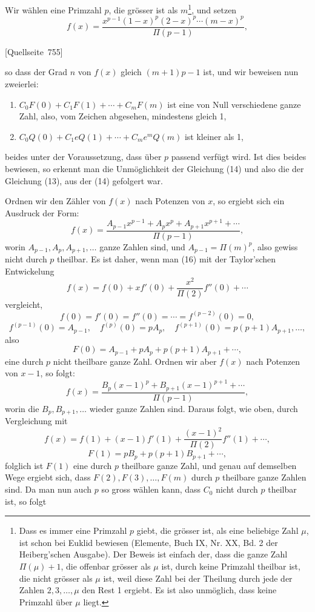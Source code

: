 \documentclass[11pt]{article}
\newcommand{\srcpage}[1]{\par\medskip\noindent\textsf{[Quellseite~#1]}\par\smallskip}
\begin{document}
Wir wählen eine Primzahl $p$, die grösser ist als $m$\footnote{Dass es immer eine Primzahl $p$ giebt, die grösser ist, als eine beliebige Zahl $\mu$, ist schon bei Euklid bewiesen (Elemente, Buch IX, Nr. XX, Bd. 2 der Heiberg'schen Ausgabe). Der Beweis ist einfach der, dass die ganze Zahl $\Pi(\mu)+1$, die offenbar grösser als $\mu$ ist, durch keine Primzahl theilbar ist, die nicht grösser als $\mu$ ist, weil diese Zahl bei der Theilung durch jede der Zahlen $2,3,\ldots,\mu$ den Rest 1 ergiebt. Es ist also unmöglich, dass keine Primzahl über $\mu$ liegt.}, und setzen
\begin{equation}\tag{15}
f(x)=\frac{x^{p-1}(1-x)^p(2-x)^p\cdots(m-x)^p}{\Pi(p-1)},
\end{equation}
\srcpage{755}
so dass der Grad $n$ von $f(x)$ gleich $(m+1)p-1$ ist, und wir beweisen nun zweierlei:
\begin{enumerate}[label=\arabic*)]
\item $C_0F(0)+C_1F(1)+\cdots+C_mF(m)$ ist eine von Null verschiedene ganze Zahl, also, vom Zeichen abgesehen, mindestens gleich 1,
\item $C_0Q(0)+C_1eQ(1)+\cdots+C_me^mQ(m)$ ist kleiner als 1,
\end{enumerate}
beides unter der Voraussetzung, dass über $p$ passend verfügt wird. Ist dies beides bewiesen, so erkennt man die Unmöglichkeit der Gleichung (14) und also die der Gleichung (13), aus der (14) gefolgert war.

Ordnen wir den Zähler von $f(x)$ nach Potenzen von $x$, so ergiebt sich ein Ausdruck der Form:
\begin{equation}\tag{16}
f(x)=\frac{A_{p-1}x^{p-1}+A_px^p+A_{p+1}x^{p+1}+\cdots}{\Pi(p-1)},
\end{equation}
worin $A_{p-1},A_p,A_{p+1},\ldots$ ganze Zahlen sind, und $A_{p-1}=\Pi(m)^p$, also gewiss nicht durch $p$ theilbar. Es ist daher, wenn man (16) mit der Taylor'schen Entwickelung
\[
f(x)=f(0)+xf'(0)+\frac{x^2}{\Pi(2)}f''(0)+\cdots
\]
vergleicht,
\[
f(0)=f'(0)=f''(0)=\cdots=f^{(p-2)}(0)=0,
\]
\[
f^{(p-1)}(0)=A_{p-1},\quad f^{(p)}(0)=pA_p,\quad
f^{(p+1)}(0)=p(p+1)A_{p+1},\ldots,
\]
also
\[
F(0)=A_{p-1}+pA_p+p(p+1)A_{p+1}+\cdots,
\]
eine durch $p$ nicht theilbare ganze Zahl. Ordnen wir aber $f(x)$ nach Potenzen von $x-1$, so folgt:
\[
f(x)=\frac{B_p(x-1)^p+B_{p+1}(x-1)^{p+1}+\cdots}{\Pi(p-1)},
\]
worin die $B_p,B_{p+1},\ldots$ wieder ganze Zahlen sind. Daraus folgt, wie oben, durch Vergleichung mit
\[
f(x)=f(1)+(x-1)f'(1)+\frac{(x-1)^2}{\Pi(2)}f''(1)+\cdots,
\]
\[
F(1)=pB_p+p(p+1)B_{p+1}+\cdots,
\]
folglich ist $F(1)$ eine durch $p$ theilbare ganze Zahl, und genau auf demselben Wege ergiebt sich, dass $F(2),F(3),\ldots,F(m)$ durch $p$ theilbare ganze Zahlen sind. Da man nun auch $p$ so gross wählen kann, dass $C_0$ nicht durch $p$ theilbar ist, so folgt
\end{document}
